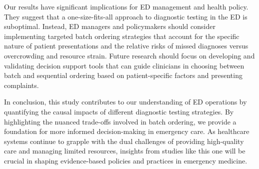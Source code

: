 \documentclass[,,nonblindrev]{informs}
\begin{document}
Our results have significant implications for ED management and health
policy. They suggest that a one-size-fits-all approach to diagnostic
testing in the ED is suboptimal. Instead, ED managers and policymakers
should consider implementing targeted batch ordering strategies that
account for the specific nature of patient presentations and the
relative risks of missed diagnoses versus overcrowding and resource
strain. Future research should focus on developing and validating
decision support tools that can guide clinicians in choosing between
batch and sequential ordering based on patient-specific factors and
presenting complaints.

In conclusion, this study contributes to our understanding of ED
operations by quantifying the causal impacts of different diagnostic
testing strategies. By highlighting the nuanced trade-offs involved in
batch ordering, we provide a foundation for more informed
decision-making in emergency care. As healthcare systems continue to
grapple with the dual challenges of providing high-quality care and
managing limited resources, insights from studies like this one will be
crucial in shaping evidence-based policies and practices in emergency
medicine.

\newpage

%
%
%


\ACKNOWLEDGMENT{}



\end{document}
